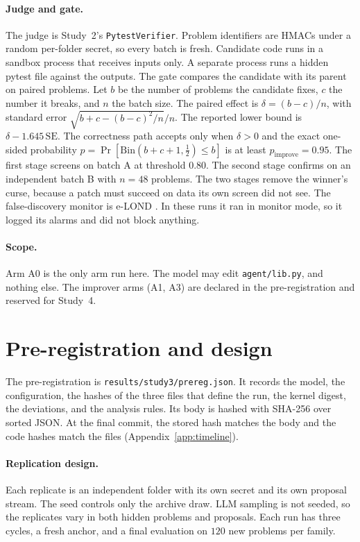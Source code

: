 \documentclass[11pt]{article}
\begin{document}
\paragraph{Judge and gate.} The judge is Study~2's \texttt{PytestVerifier}. Problem identifiers are HMACs under a random per-folder secret, so every batch is fresh. Candidate code runs in a sandbox process that receives inputs only. A separate process runs a hidden pytest file against the outputs.
The gate compares the candidate with its parent on paired problems. Let $b$ be the number of problems the candidate fixes, $c$ the number it breaks, and $n$ the batch size. The paired effect is $\delta=(b-c)/n$, with standard error $\sqrt{b+c-(b-c)^2/n}/n$. The reported lower bound is $\delta-1.645\,\mathrm{SE}$. The correctness path accepts only when $\delta>0$ and the exact one-sided probability $p=\Pr[\mathrm{Bin}(b+c+1,\tfrac12)\le b]$ is at least $p_{\mathrm{improve}}=0.95$. The first stage screens on batch A at threshold $0.80$. The second stage confirms on an independent batch B with $n=48$ problems. The two stages remove the winner's curse, because a patch must succeed on data its own screen did not see.
The false-discovery monitor is e-LOND \citep{xu2024elond}. In these runs it ran in monitor mode, so it logged its alarms and did not block anything.

\paragraph{Scope.} Arm A0 is the only arm run here. The model may edit \texttt{agent/lib.py}, and nothing else. The improver arms (A1, A3) are declared in the pre-registration and reserved for Study~4.

\section{Pre-registration and design}
\label{sec:prereg}

The pre-registration is \texttt{results/study3/prereg.json}. It records the model, the configuration, the hashes of the three files that define the run, the kernel digest, the deviations, and the analysis rules. Its body is hashed with SHA-256 over sorted JSON. At the final commit, the stored hash matches the body and the code hashes match the files (Appendix~\ref{app:timeline}).

\paragraph{Replication design.} Each replicate is an independent folder with its own secret and its own proposal stream. The seed controls only the archive draw. LLM sampling is not seeded, so the replicates vary in both hidden problems and proposals. Each run has three cycles, a fresh anchor, and a final evaluation on $120$ new problems per family.
\end{document}
